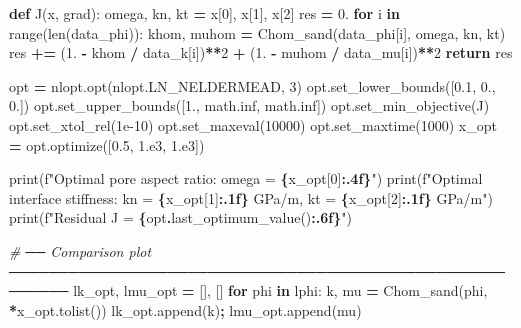 \documentclass[
  a4paper,
  numbers=noendperiod,
  DIV=12]{scrreprt}
\newenvironment{Shaded}{\begin{snugshade}}{\end{snugshade}}
\newcommand{\BuiltInTok}[1]{#1}
\newcommand{\CommentTok}[1]{\textcolor[rgb]{0.56,0.35,0.01}{\textit{#1}}}
\newcommand{\ControlFlowTok}[1]{\textcolor[rgb]{0.13,0.29,0.53}{\textbf{#1}}}
\newcommand{\DecValTok}[1]{\textcolor[rgb]{0.00,0.00,0.81}{#1}}
\newcommand{\FloatTok}[1]{\textcolor[rgb]{0.00,0.00,0.81}{#1}}
\newcommand{\KeywordTok}[1]{\textcolor[rgb]{0.13,0.29,0.53}{\textbf{#1}}}
\newcommand{\NormalTok}[1]{#1}
\newcommand{\OperatorTok}[1]{\textcolor[rgb]{0.81,0.36,0.00}{\textbf{#1}}}
\newcommand{\SpecialCharTok}[1]{\textcolor[rgb]{0.81,0.36,0.00}{\textbf{#1}}}
\newcommand{\SpecialStringTok}[1]{\textcolor[rgb]{0.31,0.60,0.02}{#1}}
\begin{document}
\begin{tcolorbox}
\begin{Shaded}
\begin{Highlighting}[]
\KeywordTok{def}\NormalTok{ J(x, grad):}
\NormalTok{    omega, kn, kt }\OperatorTok{=}\NormalTok{ x[}\DecValTok{0}\NormalTok{], x[}\DecValTok{1}\NormalTok{], x[}\DecValTok{2}\NormalTok{]}
\NormalTok{    res }\OperatorTok{=} \FloatTok{0.}
    \ControlFlowTok{for}\NormalTok{ i }\KeywordTok{in} \BuiltInTok{range}\NormalTok{(}\BuiltInTok{len}\NormalTok{(data\_phi)):}
\NormalTok{        khom, muhom }\OperatorTok{=}\NormalTok{ Chom\_sand(data\_phi[i], omega, kn, kt)}
\NormalTok{        res }\OperatorTok{+=}\NormalTok{ (}\FloatTok{1.} \OperatorTok{{-}}\NormalTok{ khom }\OperatorTok{/}\NormalTok{ data\_k[i])}\OperatorTok{**}\DecValTok{2} \OperatorTok{+}\NormalTok{ (}\FloatTok{1.} \OperatorTok{{-}}\NormalTok{ muhom }\OperatorTok{/}\NormalTok{ data\_mu[i])}\OperatorTok{**}\DecValTok{2}
    \ControlFlowTok{return}\NormalTok{ res}

\NormalTok{opt }\OperatorTok{=}\NormalTok{ nlopt.opt(nlopt.LN\_NELDERMEAD, }\DecValTok{3}\NormalTok{)}
\NormalTok{opt.set\_lower\_bounds([}\FloatTok{0.1}\NormalTok{, }\FloatTok{0.}\NormalTok{, }\FloatTok{0.}\NormalTok{])}
\NormalTok{opt.set\_upper\_bounds([}\FloatTok{1.}\NormalTok{, math.inf, math.inf])}
\NormalTok{opt.set\_min\_objective(J)}
\NormalTok{opt.set\_xtol\_rel(}\FloatTok{1e{-}10}\NormalTok{)}
\NormalTok{opt.set\_maxeval(}\DecValTok{10000}\NormalTok{)}
\NormalTok{opt.set\_maxtime(}\DecValTok{1000}\NormalTok{)}
\NormalTok{x\_opt }\OperatorTok{=}\NormalTok{ opt.optimize([}\FloatTok{0.5}\NormalTok{, }\FloatTok{1.e3}\NormalTok{, }\FloatTok{1.e3}\NormalTok{])}

\BuiltInTok{print}\NormalTok{(}\SpecialStringTok{f"Optimal pore aspect ratio:  omega = }\SpecialCharTok{\{}\NormalTok{x\_opt[}\DecValTok{0}\NormalTok{]}\SpecialCharTok{:.4f\}}\SpecialStringTok{"}\NormalTok{)}
\BuiltInTok{print}\NormalTok{(}\SpecialStringTok{f"Optimal interface stiffness: kn = }\SpecialCharTok{\{}\NormalTok{x\_opt[}\DecValTok{1}\NormalTok{]}\SpecialCharTok{:.1f\}}\SpecialStringTok{ GPa/m,  kt = }\SpecialCharTok{\{}\NormalTok{x\_opt[}\DecValTok{2}\NormalTok{]}\SpecialCharTok{:.1f\}}\SpecialStringTok{ GPa/m"}\NormalTok{)}
\BuiltInTok{print}\NormalTok{(}\SpecialStringTok{f"Residual J = }\SpecialCharTok{\{}\NormalTok{opt}\SpecialCharTok{.}\NormalTok{last\_optimum\_value()}\SpecialCharTok{:.6f\}}\SpecialStringTok{"}\NormalTok{)}

\CommentTok{\# ── Comparison plot ────────────────────────────────────────────────────────}
\NormalTok{lk\_opt, lmu\_opt }\OperatorTok{=}\NormalTok{ [], []}
\ControlFlowTok{for}\NormalTok{ phi }\KeywordTok{in}\NormalTok{ lphi:}
\NormalTok{    k, mu }\OperatorTok{=}\NormalTok{ Chom\_sand(phi, }\OperatorTok{*}\NormalTok{x\_opt.tolist())}
\NormalTok{    lk\_opt.append(k)}\OperatorTok{;}\NormalTok{ lmu\_opt.append(mu)}


\end{Highlighting}
\end{Shaded}
\end{tcolorbox}
\end{document}
